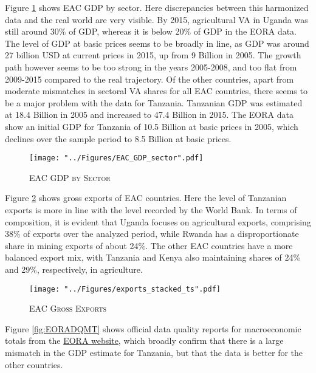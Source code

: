 \documentclass[a4paper]{article}
\begin{document}
Figure \ref{fig:EAC_GDP_sec} shows EAC GDP by sector. Here discrepancies between this harmonized data and the real world are very visible. By 2015, agricultural VA in Uganda was still around 30\% of GDP, whereas it is below 20\% of GDP in the EORA data. The level of GDP at basic prices seems to be broadly in line, as GDP was around 27 billion USD at current prices in 2015, up from 9 Billion in 2005. The growth path however seems to be too strong in the years 2005-2008, and too flat from 2009-2015 compared to the real trajectory. Of the other countries, apart from moderate mismatches in sectoral VA shares for all EAC countries, there seems to be a major problem with the data for Tanzania. Tanzanian GDP was estimated at 18.4 Billion in 2005 and increased to 47.4 Billion in 2015. The EORA data show an initial GDP for Tanzania of 10.5 Billion at basic prices in 2005, which declines over the sample period to 8.5 Billion at basic prices. \newline

\begin{figure}[h!]
\centering
\caption{\label{fig:EAC_GDP_sec}\textsc{EAC GDP by Sector}}
\texttt{[image: "../Figures/EAC\_GDP\_sector".pdf]} %
\end{figure}
\FloatBarrier

Figure \ref{fig:exp} shows gross exports of EAC countries. Here the level of Tanzanian exports is more in line with the level recorded by the World Bank. In terms of composition, it is evident that Uganda focuses on agricultural exports, comprising 38\% of exports over the analyzed period, while Rwanda has a disproportionate share in mining exports of about 24\%. The other EAC countries have a more balanced export mix, with Tanzania and Kenya also maintaining shares of 24\% and 29\%, respectively, in agriculture. 

\begin{figure}[h!]
\centering
\caption{\label{fig:exp}\textsc{EAC Gross Exports}}
\texttt{[image: "../Figures/exports\_stacked\_ts".pdf]} %
\end{figure}
\FloatBarrier

Figure \ref{fig:EORADQMT} shows official data quality reports for macroeconomic totals from the \href{https://worldmrio.com/quality/}{EORA website}, which broadly confirm that there is a large mismatch in the GDP estimate for Tanzania, but that the data is better for the other countries. \newline
\end{document}
